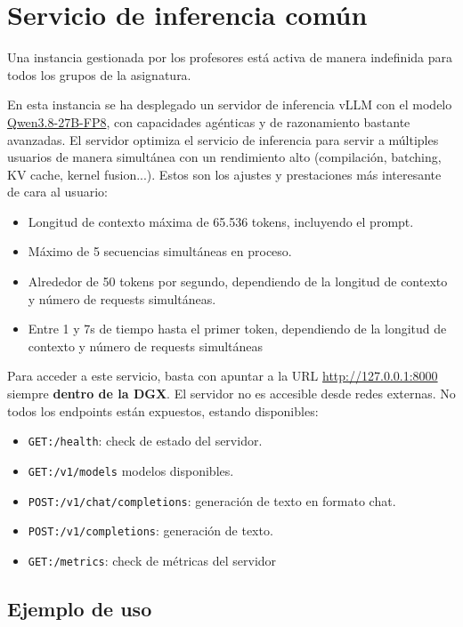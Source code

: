 \documentclass[11pt,a4paper]{article}
\newcommand{\code}[1]{{\small\texttt{#1}}}
\begin{document}
\section{Servicio de inferencia común}

Una instancia gestionada por los profesores está activa de manera indefinida para todos los grupos 
de la asignatura. 

En esta instancia se ha desplegado un servidor de inferencia vLLM con el modelo \href{https://huggingface.co/Qwen/Qwen3.8-27B-FP8}{Qwen3.8-27B-FP8},
con capacidades agénticas y de razonamiento bastante avanzadas. El servidor optimiza el servicio 
de inferencia para servir a múltiples usuarios de manera simultánea con un rendimiento alto (compilación,
batching, KV cache, kernel fusion...). Estos son los ajustes y prestaciones más interesante de cara al usuario:

\begin{itemize}
\item Longitud de contexto máxima de 65.536 tokens, incluyendo el prompt.
\item Máximo de 5 secuencias simultáneas en proceso.
\item Alrededor de 50 tokens por segundo, dependiendo de la longitud de contexto y número de requests simultáneas.
\item Entre 1 y 7s de tiempo hasta el primer token, dependiendo de la longitud de contexto y número de requests simultáneas
\end{itemize}

Para acceder a este servicio, basta con apuntar a la URL \url{http://127.0.0.1:8000} siempre \textbf{dentro de la DGX}.
El servidor no es accesible desde redes externas. No todos los endpoints están expuestos, estando 
disponibles:

\begin{itemize}
  \item \code{GET:/health}: check de estado del servidor.
  \item \code{GET:/v1/models} modelos disponibles.
  \item \code{POST:/v1/chat/completions}: generación de texto en formato chat.
  \item \code{POST:/v1/completions}: generación de texto.
  \item \code{GET:/metrics}: check de métricas del servidor
\end{itemize}

\pagebreak

\subsection{Ejemplo de uso}
\end{document}
